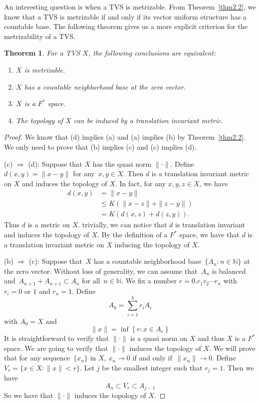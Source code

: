 \documentclass[12pt,a4paper,draft]{article}  %
\newtheorem{theorem}{Theorem}[section]
\theoremstyle{definition}
\numberwithin{equation}{section}
\newcommand{\NN}{\mathbb{N}}
\begin{document}
An interesting question is when a TVS is metrizable.
From Theorem~\eqref{thm2.2}, we know that a TVS is metrizable if and only if its vector uniform structure has a countable base.
The following theorem gives us a more explicit criterion for the metrizability of a TVS.
\begin{theorem} \label{thm3.2}
    For a TVS $X$, the following conclusions are equivalent:
    \begin{enumerate}
        \item $X$ is metrizable.
        \item $X$ has a countable neighborhood base at the zero vector.
        \item $X$ is a $F^*$ space.
        \item The topology of $X$ can be induced by a translation invariant metric.
    \end{enumerate}
\end{theorem}
\begin{proof}
    We know that (d) implies (a) and (a) implies (b) by Theorem~\eqref{thm2.2}.
    We only need to prove that (b) implies (c) and (c) implies (d).

    (c) $\Rightarrow$ (d): Suppose that $X$ has the quasi norm $\|\cdot\|$.
    Define $d(x,y) = \|x-y\|$ for any~$x,y \in X$.
    Then $d$ is a translation invariant metric on $X$ and induces the topology of $X$.
    In fact, for any $x,y,z \in X$, we have
    \begin{align}
        d(x,y) & = \|x-y\| \nonumber \\
        & \leq K(\|x-z\| + \|z-y\|) \nonumber \\
        & = K(d(x,z) + d(z,y)). \nonumber
    \end{align}
    Thus $d$ is a metric on $X$. trivially, we can notice that $d$ is translation invariant and induces the topology of $X$.
    By the definition of a $F^*$ space, we have that $d$ is a translation invariant metric on $X$ inducing the topology of $X$.

    (b) $\Rightarrow$ (c): Suppose that~$X$ has a countable neighborhood base~$\{A_n: n \in \NN\}$ at the zero vector.
    Without loss of generality, we can assume that~$A_n$ is balanced and~$A_{n+1} + A_{n+1} \subset A_n$ for all~$n \in \NN$.
    We fix a number $r=0.r_1 r_2 \cdots r_n$ with~$r_i = 0 \text{ or } 1$ and $r_n=1$.
    Define 
    $$ A_k = \sum_{i=1}^{k} r_i A_i $$
    with $A_0=X$ and 
    $$\|x\| = \inf\left\{ r: x \in A_r\right\} $$
    It is straightforward to verify that $\|\cdot\|$ is a quasi norm on $X$ and thus $X$ is a $F^*$ space.
    We are going to verify that $\|\cdot\|$ induces the topology of $X$.
    We will prove that for any sequence~$\{x_n\}$ in $X$, $x_n \rightarrow 0$ if and only if~$\|x_n\| \rightarrow 0$.
    Define $V_r=\{x\in X : \|x\| < r \}$.
    Let $j$ be the smallest integer such that $r_j=1$.
    Then we have 
    $$ A_n \subset V_r \subset A_{j-1}  $$
    So we have that $\|\cdot\|$ induces the topology of $X$.
\end{proof}
    
\end{document}
